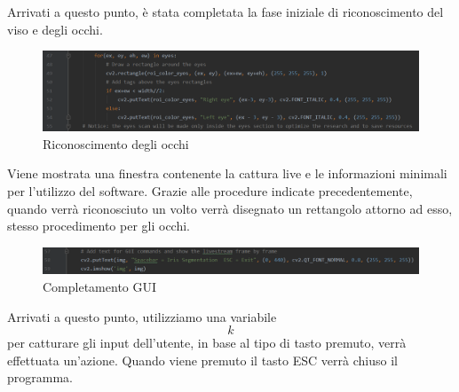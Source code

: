 Arrivati a questo punto, è stata completata la fase iniziale di riconoscimento del viso e degli occhi.
\begin{figure}[h!]
	\centering
	\includegraphics[width=120mm]{img/5/codice_1_4}
	\caption{\fontsize{10px}{0mm}\selectfont Riconoscimento degli occhi \label{fig:codice_1_4}}
\end{figure}

Viene mostrata una finestra contenente la cattura live e le informazioni minimali per l'utilizzo del software.
Grazie alle procedure indicate precedentemente, quando verrà riconosciuto un volto verrà disegnato un rettangolo attorno ad esso, stesso procedimento per gli occhi.

\begin{figure}[h!]
	\centering
	\includegraphics[width=120mm]{img/5/codice_1_5}
	\caption{\fontsize{10px}{0mm}\selectfont Completamento GUI \label{fig:codice_1_5}}
\end{figure}

Arrivati a questo punto, utilizziamo una variabile $$k$$ per catturare gli input dell'utente, in base al tipo di tasto premuto, verrà effettuata un'azione. Quando viene premuto il tasto ESC verrà chiuso il programma.

